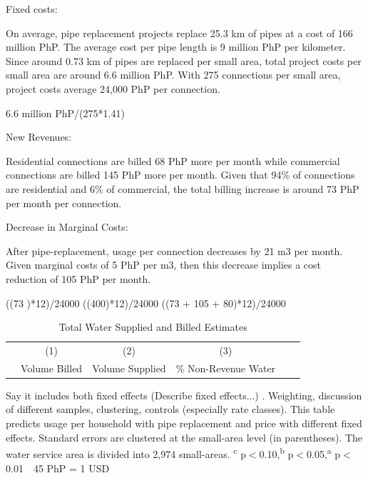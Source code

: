 \documentclass[12pt,table]{article}
\newcommand{\regtext}{
Standard errors are clustered at the small-area level (in parentheses).  The water service area is divided into 2,974 small-areas.
\textsuperscript{c} p$<$0.10,\textsuperscript{b} p$<$0.05,\textsuperscript{a} p$<$0.01 \,\,
}
\begin{document}
Fixed costs:

On average, pipe replacement projects replace 25.3 km of pipes at a cost of 166 million PhP.  The average cost per pipe length is 9 million PhP per kilometer.  Since around 0.73 km of pipes are replaced per small area, total project costs per small area are around 6.6 million PhP.  With 275 connections per small area, project costs average 24,000 PhP per connection.   

6.6 million PhP/(275*1.41)


New Revenues:

Residential connections are billed 68 PhP more per month while commercial connections are billed 145 PhP more per month.  Given that 94\% of connections are residential and 6\% of commercial, the total billing increase is around 73 PhP per month per connection.  

Decrease in Marginal Costs:

After pipe-replacement, usage per connection decreases by 21 m3 per month.  Given marginal costs of 5 PhP per m3, then this decrease implies a cost reduction of 105 PhP per month.  


((73 )*12)/24000
((400)*12)/24000
((73 + 105 + 80)*12)/24000



\begin{table}[h!] 
\centering
\caption{Total Water Supplied and Billed Estimates}\label{table:nrwregs}
\vspace{-2mm}
\begin{threeparttable}
\begin{tabular}{@{}l*{1}{CCCCC}@{}}
\toprule
  & (1)   & (2)   & (3) \\
  & Volume Billed  & Volume Supplied & \% Non-Revenue Water \\
\midrule

\bottomrule
\end{tabular}
\begin{tablenotes}
\footnotesize
\item Say it includes both fixed effects (Describe fixed effects...) .  Weighting, discussion of different samples, clustering, controls (especially rate classes).  This table predicts usage per household with pipe replacement and price with different fixed effects.   \regtext 45 PhP = 1 USD \,\,
\end{tablenotes}
\end{threeparttable}
\end{table}
\end{document}

